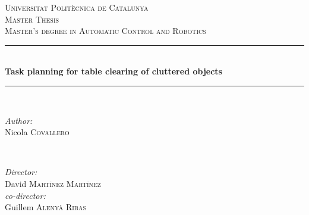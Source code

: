 \begin{titlepage}

\vspace*{\fill}

\newcommand{\HRule}{\rule{\linewidth}{0.5mm}} %

\center %
 

\textsc{\LARGE Universitat Polit\`ecnica de Catalunya}\\[1.5cm] %
\textsc{\Large Master Thesis}\\[0.5cm] %
\textsc{\large Master's degree in Automatic Control and Robotics}\\[0.5cm] %


\HRule \\[0.4cm]
{ \huge \bfseries Task planning for table clearing of cluttered objects}\\[0.4cm] %
\HRule \\[1.5cm]
 

\begin{minipage}{0.4\textwidth}
\begin{flushleft} \large
\emph{Author:}\\
Nicola \textsc{Covallero} %
\end{flushleft}
\end{minipage}
~
\begin{minipage}{0.4\textwidth}
\begin{flushright} \large
\emph{Director:}\\
David \textsc{Martínez Martínez} \\
\emph{co-director:} \\
Guillem \textsc{Aleny\`a Ribas} \\
\end{flushright}
\end{minipage}\\[1cm]


\end{titlepage}
